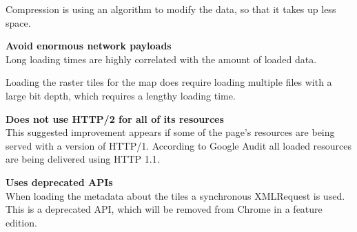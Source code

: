 Compression is using an algorithm to modify the data, so that it takes up less space.
\citep{MinifyJS}

\textbf{Avoid enormous network payloads}\\
Long loading times are highly correlated with the amount of loaded data.  
\citep{LoadingTooMuch}

Loading the raster tiles for the map does require loading multiple files with a large bit depth, which requires a lengthy loading time. 

\textbf{Does not use HTTP/2 for all of its resources}\\
This suggested improvement appears if some of the page’s resources are being served with a version of HTTP/1. According to Google Audit all loaded resources are being delivered using HTTP 1.1.


\citep{HTTP2}

\textbf{Uses deprecated APIs}\\
When loading the metadata about the tiles a synchronous XMLRequest is used. This is a deprecated API, which will be removed from Chrome in a feature edition. 
\citep{OldApis}
